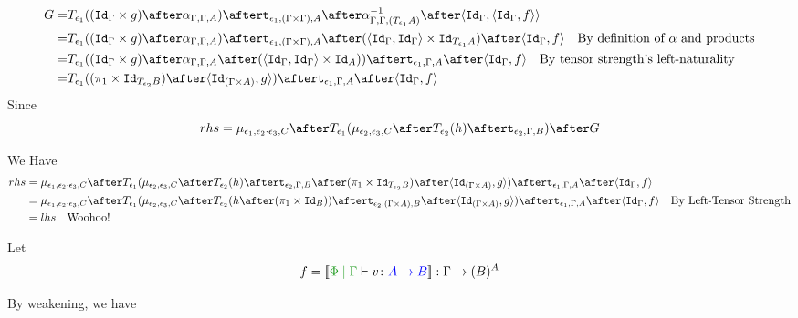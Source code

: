 {\begin{equation}
    \begin{split}
        G = & \T{\e_1}{((\idg\times g)\after \alpha_{\G, \G, A})} \after \tstrength{\e_1}{(\G\times\G)}{A}\after\alpha^{-1}_{\G, \G, (\T{\e_1}{A})}\after\pr{\idg}{\pr{\idg}{f}} \\
        = & \T{\e_1}{((\idg\times g)\after \alpha_{\G, \G, A})} \after \tstrength{\e_1}{(\G\times\G)}{A}\after(\pr{\idg}{\idg}\times \Id{\T{\e_1}{A}})\after\pr{\idg}{f}\qt{By definition of $\alpha$ and products}\\
        = & \T{\e_1}{((\idg\times g)\after \alpha_{\G, \G, A}\after(\pr{\idg}{\idg}\times \Id{A}))}\after\tstrength{\e_1}{\G}{A}\after\pr{\idg}{f}\qt{By tensor strength's left-naturality}\\
        = & \T{\e_1}{((\p\times\Id{\T{\e_2}{B}})\after\pr{\Id{(\G\times A)}}{g})}\after\tstrength{\e_1}{\G}{A}\after\pr{\idg}{f}
    \end{split}
\end{equation}
Since 
\begin{equation}
rhs = \bind{\e_1}{\e_2\dot\e_3}{C}\after\T{\e_1}{(\bind{\e_2}{\e_3}{C}\after \T{\e_2}{(h)} \after \tstrength{\e_2}{\G}{B})}\after G
\end{equation}

We Have
\begin{equation}
\begin{split}
    rhs ={} & \bind{\e_1}{\e_2\dot\e_3}{C}\after\T{\e_1}{(\bind{\e_2}{\e_3}{C}\after \T{\e_2}{(h)} \after \tstrength{\e_2}{\G}{B}\after(\p\times\Id{\T{\e_2}{B}})\after\pr{\Id{(\G\times A)}}{g})}\after\tstrength{\e_1}{\G}{A}\after\pr{\idg}{f}\\
    ={} & \bind{\e_1}{\e_2\dot\e_3}{C}\after\T{\e_1}{(\bind{\e_2}{\e_3}{C}\after \T{\e_2}{(h \after (\p\times\Id{B}))}\after\tstrength{\e_2}{(\G\times A)}{B}\after\pr{\Id{(\G\times A)}}{g})}\after\tstrength{\e_1}{\G}{A}\after\pr{\idg}{f}\qt{By Left-Tensor Strength}\\
    ={} & lhs \qt{Woohoo!}
\end{split}
\end{equation}


Let 
\begin{equation}
    f = \deno{\gpetyperelation{v}{\ab}} : \G \rightarrow (B)^{A}
\end{equation}

By weakening, we have

}
